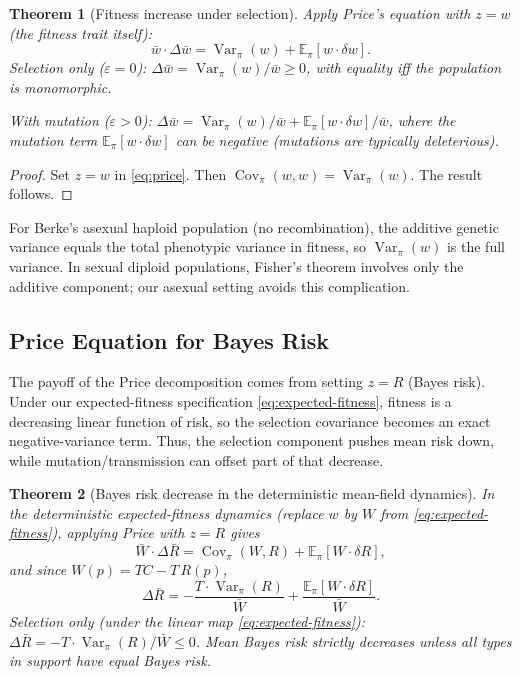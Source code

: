 \documentclass[12pt]{article}
\newtheorem{theorem}{Theorem}[section]
\newcommand{\Rbar}{\bar{R}}
\newcommand{\wbar}{\bar{w}}
\newcommand{\Wbar}{\bar{W}}
\newcommand{\E}{\mathbb{E}}
\newcommand{\Var}{\operatorname{Var}}
\newcommand{\Cov}{\operatorname{Cov}}
\begin{document}
\begin{theorem}[Fitness increase under selection]\label{thm:fisher}
Apply Price's equation with $z = w$ (the fitness trait itself):
\begin{equation}
\wbar \cdot \Delta \wbar = \Var_\pi(w) + \E_\pi[w \cdot \delta w].
\end{equation}
\emph{Selection only} ($\varepsilon = 0$): $\Delta \wbar = \Var_\pi(w)/\wbar \ge 0$, with equality iff the population is monomorphic.

\emph{With mutation} ($\varepsilon > 0$): $\Delta \wbar = \Var_\pi(w)/\wbar + \E_\pi[w \cdot \delta w]/\wbar$, where the mutation term $\E_\pi[w \cdot \delta w]$ can be negative (mutations are typically deleterious).
\end{theorem}

\begin{proof}
Set $z = w$ in \eqref{eq:price}. Then $\Cov_\pi(w, w) = \Var_\pi(w)$. The result follows.
\end{proof}

For Berke's asexual haploid population (no recombination), the additive genetic variance equals the total phenotypic variance in fitness, so $\Var_\pi(w)$ is the full variance. In sexual diploid populations, Fisher's theorem involves only the additive component; our asexual setting avoids this complication.

\subsection{Price Equation for Bayes Risk}\label{sec:price-risk}

The payoff of the Price decomposition comes from setting $z = R$ (Bayes risk). Under our expected-fitness specification \eqref{eq:expected-fitness}, fitness is a decreasing linear function of risk, so the selection covariance becomes an exact negative-variance term. Thus, the selection component pushes mean risk down, while mutation/transmission can offset part of that decrease.

\begin{theorem}[Bayes risk decrease in the deterministic mean-field dynamics]\label{thm:price-risk}
In the deterministic expected-fitness dynamics (replace $w$ by $W$ from \eqref{eq:expected-fitness}), applying Price with $z = R$ gives
\begin{equation}
\Wbar \cdot \Delta \Rbar = \Cov_\pi(W, R) + \E_\pi[W \cdot \delta R],
\end{equation}
and since $W(p) = TC - T\, R(p)$,
\begin{equation}\label{eq:risk-decrease}
\Delta \Rbar = -\frac{T \cdot \Var_\pi(R)}{\Wbar} + \frac{\E_\pi[W \cdot \delta R]}{\Wbar}.
\end{equation}
\emph{Selection only (under the linear map \eqref{eq:expected-fitness}):} $\Delta \Rbar = -T \cdot \Var_\pi(R)/\Wbar \le 0$. Mean Bayes risk strictly decreases unless all types in support have equal Bayes risk.
\end{theorem}
\end{document}
